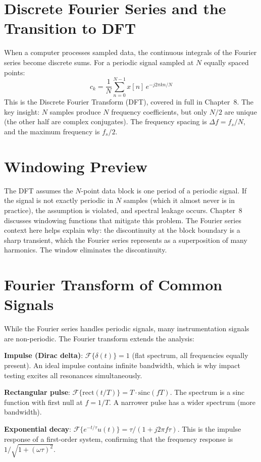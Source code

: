 \documentclass[11pt,letterpaper,twoside,openany]{book}
\begin{document}
\section{Discrete Fourier Series and the Transition to DFT}
When a computer processes sampled data, the continuous integrals of the Fourier series become discrete sums. For a periodic signal sampled at $N$ equally spaced points:
\begin{equation}
c_k = \frac{1}{N}\sum_{n=0}^{N-1} x[n]\,e^{-j2\pi kn/N}
\end{equation}
This is the Discrete Fourier Transform (DFT), covered in full in Chapter~8. The key insight: $N$ samples produce $N$ frequency coefficients, but only $N/2$ are unique (the other half are complex conjugates). The frequency spacing is $\Delta f = f_s/N$, and the maximum frequency is $f_s/2$.

\section{Windowing Preview}
The DFT assumes the $N$-point data block is one period of a periodic signal. If the signal is not exactly periodic in $N$ samples (which it almost never is in practice), the assumption is violated, and spectral leakage occurs. Chapter~8 discusses windowing functions that mitigate this problem. The Fourier series context here helps explain why: the discontinuity at the block boundary is a sharp transient, which the Fourier series represents as a superposition of many harmonics. The window eliminates the discontinuity.
\section{Fourier Transform of Common Signals}
While the Fourier series handles periodic signals, many instrumentation signals are non-periodic. The Fourier transform extends the analysis:

\textbf{Impulse (Dirac delta)}: $\mathcal{F}\{\delta(t)\} = 1$ (flat spectrum, all frequencies equally present). An ideal impulse contains infinite bandwidth, which is why impact testing excites all resonances simultaneously.

\textbf{Rectangular pulse}: $\mathcal{F}\{\text{rect}(t/T)\} = T \cdot \text{sinc}(fT)$. The spectrum is a sinc function with first null at $f = 1/T$. A narrower pulse has a wider spectrum (more bandwidth).

\textbf{Exponential decay}: $\mathcal{F}\{e^{-t/\tau}u(t)\} = \tau/(1+j2\pi f\tau)$. This is the impulse response of a first-order system, confirming that the frequency response is $1/\sqrt{1+(\omega\tau)^2}$.
\end{document}
